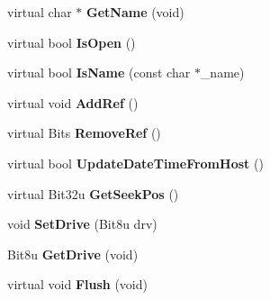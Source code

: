 \begin{DoxyCompactItemize}
\item 
\hypertarget{classDOS__File_abb4d2689b5d03d77421389629db0e1fb}{virtual char $\ast$ {\bfseries Get\-Name} (void)}\label{classDOS__File_abb4d2689b5d03d77421389629db0e1fb}

\item 
\hypertarget{classDOS__File_aa69aac124647f1ee095f165ce2bbee5b}{virtual bool {\bfseries Is\-Open} ()}\label{classDOS__File_aa69aac124647f1ee095f165ce2bbee5b}

\item 
\hypertarget{classDOS__File_ac072a4f064cb40e53291e8b7ef65c628}{virtual bool {\bfseries Is\-Name} (const char $\ast$\-\_\-name)}\label{classDOS__File_ac072a4f064cb40e53291e8b7ef65c628}

\item 
\hypertarget{classDOS__File_af518157a13945e5c73e0152add3490c8}{virtual void {\bfseries Add\-Ref} ()}\label{classDOS__File_af518157a13945e5c73e0152add3490c8}

\item 
\hypertarget{classDOS__File_a435afa3450fd4c75665f8a13ff03fb9d}{virtual Bits {\bfseries Remove\-Ref} ()}\label{classDOS__File_a435afa3450fd4c75665f8a13ff03fb9d}

\item 
\hypertarget{classDOS__File_a3e45ea4f759d34abfb4f696ee9225fae}{virtual bool {\bfseries Update\-Date\-Time\-From\-Host} ()}\label{classDOS__File_a3e45ea4f759d34abfb4f696ee9225fae}

\item 
\hypertarget{classDOS__File_a9473cbf5f0b6b3fabeeaf4c7c98f9cec}{virtual Bit32u {\bfseries Get\-Seek\-Pos} ()}\label{classDOS__File_a9473cbf5f0b6b3fabeeaf4c7c98f9cec}

\item 
\hypertarget{classDOS__File_a1874a25ea3a55075fc87c324a0f4d9b9}{void {\bfseries Set\-Drive} (Bit8u drv)}\label{classDOS__File_a1874a25ea3a55075fc87c324a0f4d9b9}

\item 
\hypertarget{classDOS__File_af4d98d880115f37ba0b3ff6e95bbaf55}{Bit8u {\bfseries Get\-Drive} (void)}\label{classDOS__File_af4d98d880115f37ba0b3ff6e95bbaf55}

\item 
\hypertarget{classDOS__File_a3a3d4b0eff671faf6e30b6af65b2054c}{virtual void {\bfseries Flush} (void)}\label{classDOS__File_a3a3d4b0eff671faf6e30b6af65b2054c}

\end{DoxyCompactItemize}

